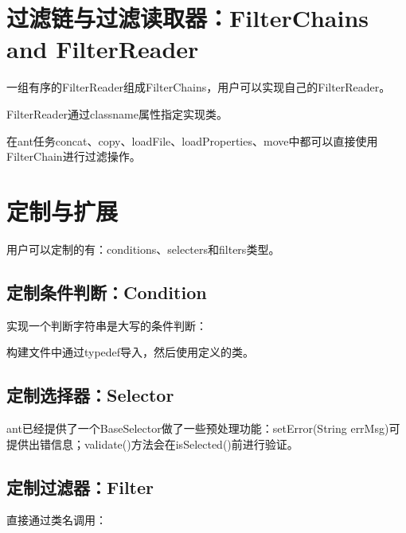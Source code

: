 \section{过滤链与过滤读取器：FilterChains and FilterReader}

	一组有序的FilterReader组成FilterChains，用户可以实现自己的FilterReader。

	FilterReader通过classname属性指定实现类。

	在ant任务concat、copy、loadFile、loadProperties、move中都可以直接使用FilterChain进行过滤操作。
		
	

\section{定制与扩展}

	用户可以定制的有：conditions、selecters和filters类型。

	\subsection{定制条件判断：Condition}

		实现一个判断字符串是大写的条件判断：

		

		构建文件中通过typedef导入，然后使用定义的类。
		
		

	\subsection{定制选择器：Selector}

		
		
		

		ant已经提供了一个BaseSelector做了一些预处理功能：setError(String errMsg)可提供出错信息；validate()方法会在isSelected()前进行验证。

	\subsection{定制过滤器：Filter}


		

		直接通过类名调用：
		
		
